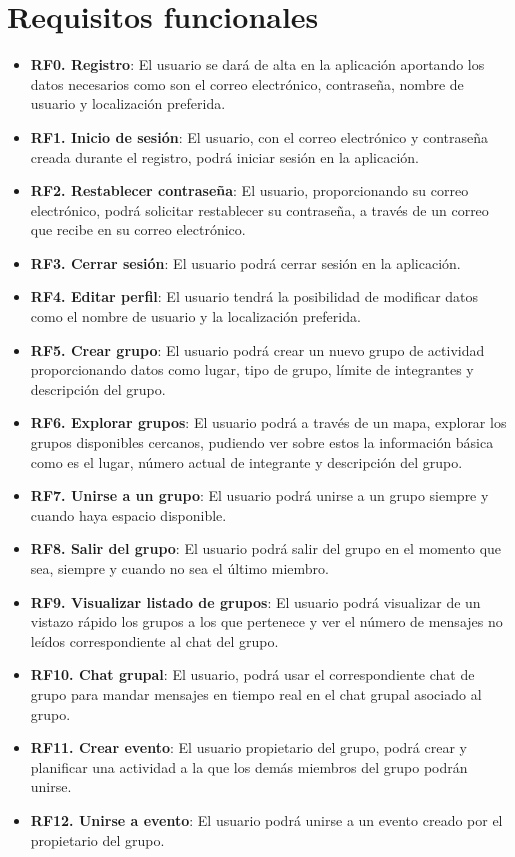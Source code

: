 \section{Requisitos funcionales}
        \begin{itemize}
            \item \textbf{RF0. Registro}: El usuario se dará de alta en la aplicación aportando los datos necesarios como son el correo electrónico, contraseña, nombre de usuario y localización preferida.
            \item \textbf{RF1. Inicio de sesión}: El usuario, con el correo electrónico y contraseña creada durante el registro, podrá iniciar sesión en la aplicación.
            \item \textbf{RF2. Restablecer contraseña}: El usuario, proporcionando su correo electrónico, podrá solicitar restablecer su contraseña, a través de un correo que recibe en su correo electrónico.
            \item \textbf{RF3. Cerrar sesión}: El usuario podrá cerrar sesión en la aplicación.
            \item \textbf{RF4. Editar perfil}: El usuario tendrá la posibilidad de modificar datos como el nombre de usuario y la localización preferida.
            \item \textbf{RF5. Crear grupo}: El usuario podrá crear un nuevo grupo de actividad proporcionando datos como lugar, tipo de grupo, límite de integrantes y descripción del grupo.
            \item \textbf{RF6. Explorar grupos}: El usuario podrá a través de un mapa, explorar los grupos disponibles cercanos, pudiendo ver sobre estos la información básica como es el lugar, número actual de integrante y descripción del grupo.
            \item \textbf{RF7. Unirse a un grupo}: El usuario podrá unirse a un grupo siempre y cuando haya espacio disponible.
            \item \textbf{RF8. Salir del grupo}: El usuario podrá salir del grupo en el momento que sea, siempre y cuando no sea el último miembro.
            \item \textbf{RF9. Visualizar listado de grupos}: El usuario podrá visualizar de un vistazo rápido los grupos a los que pertenece y ver el número de mensajes no leídos correspondiente al chat del grupo.
            \item \textbf{RF10. Chat grupal}: El usuario, podrá usar el correspondiente chat de grupo para mandar mensajes en tiempo real en el chat grupal asociado al grupo.
            \item \textbf{RF11. Crear evento}: El usuario propietario del grupo, podrá crear y planificar una actividad a la que los demás miembros del grupo podrán unirse.
            \item \textbf{RF12. Unirse a evento}: El usuario podrá unirse a un evento creado por el propietario del grupo.
        \end{itemize}

